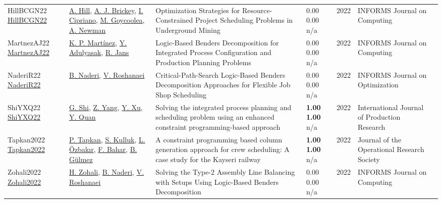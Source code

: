 {\begin{longtable}{p{3cm}p{5cm}p{10cm}p{1cm}rp{2.5cm}l}
HillBCGN22 \href{http://dx.doi.org/10.1287/ijoc.2022.1222}{HillBCGN22} & \hyperref[auth:a64]{A. Hill}, \hyperref[auth:a970]{A. J. Brickey}, \hyperref[auth:a971]{I. Cipriano}, \hyperref[auth:a972]{M. Goycoolea}, \hyperref[auth:a973]{A. Newman} & Optimization Strategies for Resource-Constrained Project Scheduling Problems in Underground Mining & \noindent{}\textcolor{black!50}{0.00} \textcolor{black!50}{0.00} n/a & 2022 & \cellcolor{red!20}INFORMS Journal on Computing & \cite{HillBCGN22}\\
MartnezAJ22 \href{http://dx.doi.org/10.1287/ijoc.2021.1079}{MartnezAJ22} & \hyperref[auth:a934]{K. P. Martínez}, \hyperref[auth:a935]{Y. Adulyasak}, \hyperref[auth:a840]{R. Jans} & Logic-Based Benders Decomposition for Integrated Process Configuration and Production Planning Problems & \noindent{}\textcolor{black!50}{0.00} \textcolor{black!50}{0.00} n/a & 2022 & \cellcolor{red!20}INFORMS Journal on Computing & \cite{MartnezAJ22}\\
NaderiR22 \href{http://dx.doi.org/10.1287/ijoo.2021.0056}{NaderiR22} & \hyperref[auth:a725]{B. Naderi}, \hyperref[auth:a727]{V. Roshanaei} & Critical-Path-Search Logic-Based Benders Decomposition Approaches for Flexible Job Shop Scheduling & \noindent{}\textcolor{black!50}{0.00} \textcolor{black!50}{0.00} n/a & 2022 & \cellcolor{red!20}INFORMS Journal on Optimization & \cite{NaderiR22}\\
ShiYXQ22 \href{https://doi.org/10.1080/00207543.2021.1963496}{ShiYXQ22} & \hyperref[auth:a445]{G. Shi}, \hyperref[auth:a446]{Z. Yang}, \hyperref[auth:a447]{Y. Xu}, \hyperref[auth:a448]{Y. Quan} & Solving the integrated process planning and scheduling problem using an enhanced constraint programming-based approach & \noindent{}\textbf{1.00} \textbf{1.00} n/a & 2022 & \cellcolor{red!20}International Journal of Production Research & \cite{ShiYXQ22}\\
Tapkan2022 \href{http://dx.doi.org/10.1080/01605682.2022.2125843}{Tapkan2022} & \hyperref[auth:a1784]{P. Tapkan}, \hyperref[auth:a1785]{S. Kulluk}, \hyperref[auth:a1786]{L. Özbakır}, \hyperref[auth:a1787]{F. Bahar}, \hyperref[auth:a1788]{B. Gülmez} & A constraint programming based column generation approach for crew scheduling: A case study for the Kayseri railway & \noindent{}\textbf{1.00} \textbf{1.00} n/a & 2022 & \cellcolor{red!20}Journal of the Operational Research Society & \cite{Tapkan2022}\\
Zohali2022 \href{http://dx.doi.org/10.1287/ijoc.2020.1015}{Zohali2022} & \hyperref[auth:a1524]{H. Zohali}, \hyperref[auth:a725]{B. Naderi}, \hyperref[auth:a727]{V. Roshanaei} & Solving the Type-2 Assembly Line Balancing with Setups Using Logic-Based Benders Decomposition & \noindent{}\textcolor{black!50}{0.00} \textcolor{black!50}{0.00} n/a & 2022 & \cellcolor{red!20}INFORMS Journal on Computing & \cite{Zohali2022}\\

\end{longtable}}

